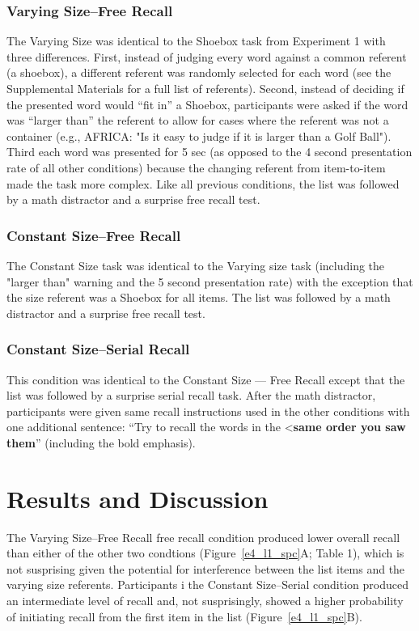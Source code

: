 \documentclass[man,natbib,floatsintext]{apa6} %
\begin{document}
\subsubsection{Varying Size--Free Recall}
The Varying Size  was identical to the Shoebox task from Experiment 1 with three differences. First, instead of judging every word against a common referent (a shoebox), a different referent was randomly selected for each word (see the Supplemental Materials for a full list of referents). Second, instead of deciding if the presented word would ``fit in'' a Shoebox, participants were asked if the word was ``larger than'' the referent to allow for cases where the referent was not a container (e.g., AFRICA: "Is it easy to judge if it is larger than a Golf Ball"). Third each word was presented for 5 sec (as opposed to the 4 second presentation rate of all other conditions) because the changing referent from item-to-item made the task more complex. Like all previous conditions, the list was followed by a math distractor and a surprise free recall test.


\subsubsection{Constant Size--Free Recall}
The Constant Size task was identical to the Varying size task (including the "larger than" warning and the 5 second presentation rate) with the exception that the size referent was a Shoebox for all items. The list was followed by a math distractor and a surprise free recall test.

\subsubsection{Constant Size--Serial Recall} 
This condition was identical to the Constant Size --- Free Recall except that the list was followed by a surprise serial recall task. After the math distractor, participants were given same recall instructions used in the other conditions with one additional sentence: ``Try to recall the words in the <\textbf{same order you saw them}'' (including the bold emphasis).

\section{Results and Discussion}

The Varying Size--Free Recall free recall condition produced lower overall recall than either of the other two condtions (Figure~\ref{e4_l1_spc}A; Table 1), which is not susprising given the potential for interference between the list items and the varying size referents. Participants i the Constant Size--Serial condition produced an intermediate level of recall and, not susprisingly, showed a higher probability of initiating recall from the first item in the list (Figure~\ref{e4_l1_spc}B). 
\end{document}
